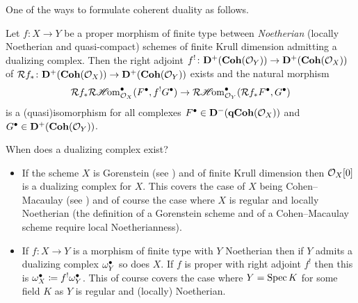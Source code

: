 One of the ways to formulate coherent duality as follows.
\begin{theorem}
	\label{theorem: coherent duality}
	
	Let $f\colon X\to Y$ be a proper morphism of finite type between \emph{Noetherian} (locally Noetherian and quasi-compact) schemes of finite Krull dimension admitting a dualizing complex. Then the right adjoint $f^!\colon {{\mathbf{D}}^+({{\mathbf{Coh}}({{\mathcal{O}}_{Y}})})} \to {{\mathbf{D}}^+({{\mathbf{Coh}}({{\mathcal{O}}_{X}})})}$ of $\mathcal{R} f_\ast\colon  {{\mathbf{D}}^+({{\mathbf{Coh}}({{\mathcal{O}}_{X}})})} \to {{\mathbf{D}}^+({{\mathbf{Coh}}({{\mathcal{O}}_{Y}})})}$ exists and the natural morphism
	$$\mathcal{R} f_\ast \mathcal{R}{\operatorname{\mathscr{H}\!om}}_{{{\mathcal{O}}_{X}}}^\bullet(F^\bullet, f^! G^\bullet) \to \mathcal{R}{\operatorname{\mathscr{H}\!om}}_{{{\mathcal{O}}_{Y}}}^\bullet(\mathcal{R} f_\ast F^\bullet, G^\bullet)$$
	is a (quasi)isomorphism for all complexes $F^\bullet \in {{\mathbf{D}}^-({{\mathbf{qCoh}}({{\mathcal{O}}_{X}})})}$ and $G^\bullet \in {{\mathbf{D}}^+({{\mathbf{Coh}}({{\mathcal{O}}_{Y}})})}$.
\end{theorem}

\begin{remark}
	When does a dualizing complex exist?
	\begin{itemize}
		\item
		If the scheme $X$ is Gorenstein (see \cite[\href{https://stacks.math.columbia.edu/tag/0AWV}{Tag 0AWV}]{stacks-project}) and of finite Krull dimension then ${{\mathcal{O}}_{X}}[0]$ is a dualizing complex for $X$. This covers the case of $X$ being Cohen--Macaulay (see \cite[\href{https://stacks.math.columbia.edu/tag/02IN}{Tag 02IN}]{stacks-project}) and of course the case where $X$ is regular and locally Noetherian (the definition of a Gorenstein scheme and of a Cohen--Macaulay scheme require local Noetherianness).
		
		\item
		If $f\colon X\to Y$ is a morphism of finite type with $Y$ Noetherian then if $Y$ admits a dualizing complex $\omega_Y^\bullet$ so does $X$. If $f$ is proper with right adjoint $f^!$ then this is $\omega_X^\bullet \coloneqq f^!\omega_Y^\bullet$. This of course covers the case where $Y=\operatorname{Spec} K$ for some field $K$ as $Y$ is regular and (locally) Noetherian.
	\end{itemize}
\end{remark}

